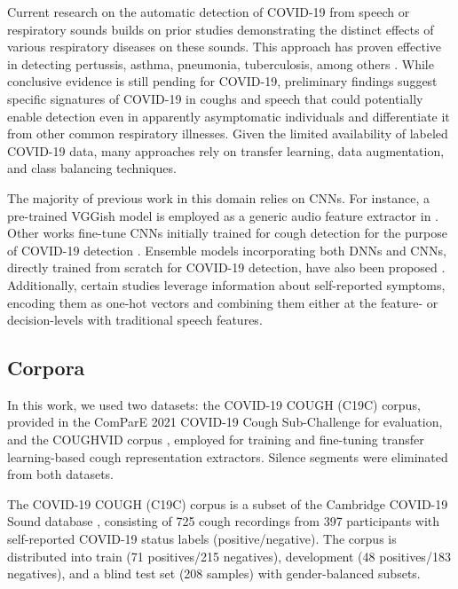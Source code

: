 Current research on the automatic detection of COVID-19 from speech or respiratory sounds builds on prior studies demonstrating the distinct effects of various respiratory diseases on these sounds. This approach has proven effective in detecting pertussis, asthma, pneumonia, tuberculosis, among others \cite{pramono2016cough}. While conclusive evidence is still pending for COVID-19, preliminary findings suggest specific signatures of COVID-19 in coughs and speech that could potentially enable detection even in apparently asymptomatic individuals and differentiate it from other common respiratory illnesses. Given the limited availability of labeled COVID-19 data, many approaches rely on transfer learning, data augmentation, and class balancing techniques.

The majority of previous work in this domain relies on CNNs. For instance, a pre-trained VGGish model \cite{Hershey2017}is employed as a generic audio feature extractor in \cite{Chloe2020}. Other works fine-tune CNNs initially trained for cough detection for the purpose of COVID-19 detection \cite{Bagad2020,Imran2020}. Ensemble models incorporating both DNNs and CNNs, directly trained from scratch for COVID-19 detection, have also been proposed \cite{Chaudhari2021}. Additionally, certain studies  \cite{Han2021} leverage information about self-reported symptoms, encoding them as one-hot vectors and combining them either at the feature- or decision-levels with traditional speech features.

\subsection{Corpora}
In this work, we used two datasets: the COVID-19 COUGH (C19C) corpus, provided in the ComParE 2021 COVID-19 Cough Sub-Challenge \cite{Chloe2020,Han2021} for evaluation, and the COUGHVID corpus \cite{Orlandic2020}, employed for training and fine-tuning transfer learning-based cough representation extractors. Silence segments were eliminated from both datasets.

The COVID-19 COUGH (C19C) corpus is a subset of the Cambridge COVID-19 Sound database \cite{Chloe2020,Han2021}, consisting of 725 cough recordings from 397 participants with self-reported COVID-19 status labels (positive/negative). The corpus is distributed into train (71 positives/215 negatives), development (48 positives/183 negatives), and a blind test set (208 samples) with gender-balanced subsets. 

